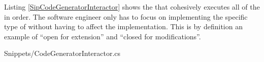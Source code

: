 Listing \ref{SipCodeGeneratorInteractor} shows the
 that cohesively executes all of the
 in order. The software engineer only has to focus on
implementing the specific type of  without having to
affect the implementation. This is by definition an example of \enquote{open for
extension} and \enquote{closed for modifications}.



    {Snippets/CodeGeneratorInteractor.cs}